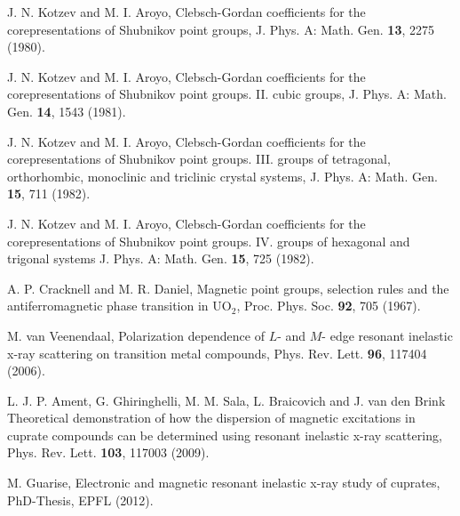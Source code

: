 \documentclass[twocolumn,prb,twocolumn,amsmath,superscriptaddress,nofootinbib,amssymb]{revtex4-1}
\begin{document}
\begin{thebibliography}{63}
J. N. Kotzev and M. I. Aroyo,
Clebsch-Gordan coefficients for the corepresentations of Shubnikov point groups,
J. Phys. A: Math. Gen. {\bf13}, 2275 (1980).

J. N. Kotzev and M. I. Aroyo,
Clebsch-Gordan coefficients for the corepresentations of Shubnikov point groups. II. cubic groups,
J. Phys. A: Math. Gen. {\bf14}, 1543 (1981).

J. N. Kotzev and M. I. Aroyo,
Clebsch-Gordan coefficients for the corepresentations of Shubnikov point groups. III. groups of tetragonal, orthorhombic, monoclinic and triclinic crystal systems,
J. Phys. A: Math. Gen. {\bf15}, 711 (1982).

J. N. Kotzev and M. I. Aroyo,
Clebsch-Gordan coefficients for the corepresentations of Shubnikov point groups. IV. groups of hexagonal and trigonal systems
J. Phys. A: Math. Gen. {\bf15}, 725 (1982).

A. P. Cracknell and M. R. Daniel,
Magnetic point groups, selection rules and the antiferromagnetic phase transition in UO$_2$,
Proc. Phys. Soc. {\bf92}, 705 (1967).

M. van Veenendaal,
Polarization dependence of $L$- and $M$- edge resonant inelastic x-ray scattering on transition metal compounds,
Phys. Rev. Lett. {\bf96}, 117404 (2006).

L. J. P. Ament, G. Ghiringhelli, M. M. Sala, L. Braicovich and J. van den Brink
Theoretical demonstration of how the dispersion of magnetic excitations in cuprate compounds can be determined using resonant inelastic x-ray scattering,
Phys. Rev. Lett. {\bf103}, 117003 (2009).

M. Guarise,
Electronic and magnetic resonant inelastic x-ray study of cuprates,
PhD-Thesis, EPFL (2012).







\end{thebibliography}
\end{document}
